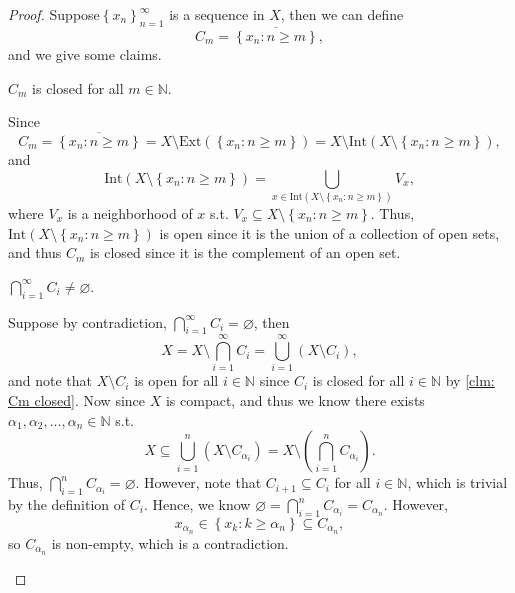 \begin{proof}
  Suppose\(\left\{ x_n \right\}_{n=1}^{\infty}\) is a sequence in \(X\), then we can define
  \[
    C_m = \overline{\left\{ x_n : n \ge m \right\} },
  \]  
  and we give some claims.
  \begin{claim} \label{clm: Cm closed}
    \(C_m\) is closed for all \(m \in \mathbb{N} \). 
  \end{claim}
  \begin{explanation}
    Since 
    \[
      C_m = \overline{\left\{ x_n: n \ge m \right\} } = X \setminus \mathrm{Ext}\left( \left\{ x_n: n \ge m \right\}  \right) = X \setminus \mathrm{Int}\left( X \setminus \left\{ x_n: n \ge m \right\}  \right),   
    \] and 
    \[
      \mathrm{Int}\left( X \setminus \left\{ x_n: n \ge m \right\}  \right) = \bigcup_{x \in \mathrm{Int}(X \setminus \left\{ x_n: n \ge m \right\} ) } V_x,  
    \] where \(V_x\) is a neighborhood of \(x\) s.t. \(V_x \subseteq X \setminus \left\{ x_n: n \ge m \right\} \). Thus, \(\mathrm{Int}\left( X \setminus \left\{ x_n: n \ge m \right\}  \right)  \) is open since it is the union of a collection of open sets, and thus \(C_m\) is closed since it is the complement of an open set.    
  \end{explanation}
  \begin{claim} \label{clm: cap Ci neq ems}
    \(\bigcap_{i=1}^{\infty} C_i \neq \varnothing \). 
  \end{claim}
  \begin{explanation}
    Suppose by contradiction, \(\bigcap_{i=1}^{\infty} C_i = \varnothing  \), then 
    \[
      X = X \setminus \bigcap_{i=1}^{\infty} C_i = \bigcup_{i=1}^{\infty} (X \setminus C_i),
    \] and note that \(X \setminus C_i\) is open for all \(i \in \mathbb{N} \) since \(C_i\) is closed for all \(i \in \mathbb{N} \) by \autoref{clm: Cm closed}. Now since \(X\) is compact, and thus we know there exists \(\alpha _1, \alpha _2, \dots , \alpha _n \in \mathbb{N} \) s.t.
    \[
      X \subseteq \bigcup_{i=1}^{n} \left( X \setminus C_{\alpha _i} \right) = X \setminus \left( \bigcap_{i=1}^{n} C_{\alpha _i} \right) .  
    \]  
    Thus, \(\bigcap_{i=1}^{n} C_{\alpha _i} = \varnothing  \). However, note that \(C_{i+1} \subseteq C_i \) for all \(i \in \mathbb{N} \), which is trivial by the definition of \(C_i\). Hence, we know \(\varnothing = \bigcap_{i=1}^{n} C_{\alpha _i} = C_{\alpha _n} \). However,
    \[
      x_{\alpha _n} \in \left\{ x_k: k \ge \alpha _n \right\} \subseteq C_{\alpha _n},
    \] so \(C_{\alpha _n}\) is non-empty, which is a contradiction. 

\end{explanation}
\end{proof}
